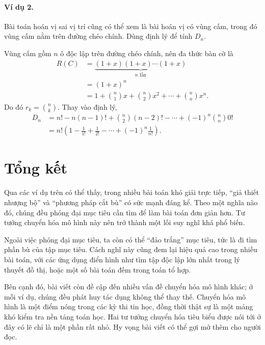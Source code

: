 \documentclass[11pt]{article}
\begin{document}
\paragraph{Ví dụ 2.}
Bài toán hoán vị sai vị trí cũng có thể xem là bài hoán vị có vùng cấm, trong
đó vùng cấm nằm trên đường chéo chính. Dùng định lý để tính $D_n$.

Vùng cấm gồm $n$ ô độc lập trên đường chéo chính, nên đa thức bàn cờ là
\[
\begin{aligned}
  R(C)
    &= \underbrace{(1+x)(1+x)\cdots(1+x)}_{n\text{ lần}}\\
    &= (1+x)^n\\
    &= 1+\binom{n}{1}x+\binom{n}{2}x^2+\cdots+\binom{n}{n}x^n.
\end{aligned}
\]
Do đó $r_k=\binom{n}{k}$. Thay vào định lý,
\[
\begin{aligned}
  D_n
    &= n!-n(n-1)!+\binom{n}{2}(n-2)!-\cdots
       +(-1)^n\binom{n}{n}0!\\
    &= n!\left(1-\frac1{1!}+\frac1{2!}-\cdots
       +(-1)^n\frac1{n!}\right).
\end{aligned}
\]

\section{Tổng kết}

Qua các ví dụ trên có thể thấy, trong nhiều bài toán khó giải trực tiếp,
``giả thiết nhượng bộ'' và ``phương pháp cắt bù'' có sức mạnh đáng kể. Theo
một nghĩa nào đó, chúng đều phóng đại mục tiêu cần tìm để làm bài toán đơn
giản hơn. Tư tưởng chuyển hóa mô hình này nên trở thành một lối suy nghĩ khá
phổ biến.

Ngoài việc phóng đại mục tiêu, ta còn có thể ``đảo trắng'' mục tiêu, tức là
đi tìm phần bù của tập mục tiêu. Cách nghĩ này cũng đem lại hiệu quả cao trong
nhiều bài toán, với các ứng dụng điển hình như tìm tập độc lập lớn nhất trong
lý thuyết đồ thị, hoặc một số bài toán đếm trong toán tổ hợp.

Bên cạnh đó, bài viết còn đề cập đến nhiều vấn đề chuyển hóa mô hình khác; ở
mỗi ví dụ, chúng đều phát huy tác dụng không thể thay thế. Chuyển hóa mô hình
là một điểm nóng trong các kỳ thi tin học, đồng thời thật sự là một mảng khó
kiểm tra nền tảng toán học. Hai tư tưởng chuyển hóa tiêu biểu được nói tới ở
đây có lẽ chỉ là một phần rất nhỏ. Hy vọng bài viết có thể gợi mở thêm cho
người đọc.
\end{document}
